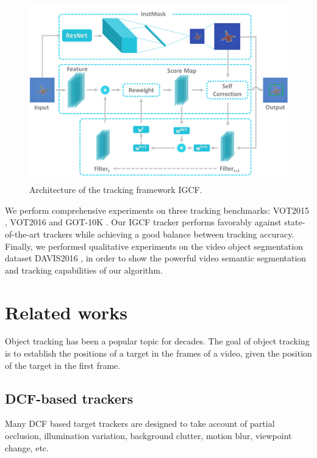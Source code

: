\documentclass[review]{elsarticle}
\begin{document}
\begin{CJK*}{UTF8}{gbsn}
\begin{figure}
    \centering
    \includegraphics[width=12cm]{images/instmask1.pdf}
    \caption{Architecture of the tracking framework IGCF.}
    \label{fig:IGCF}
\end{figure}

We perform comprehensive experiments on three tracking benchmarks: VOT2015 \cite{Kristan2015TheVO}, VOT2016 \cite{Kristan2016TheVO} and GOT-10K \cite{Huang2018GOT10kAL}. Our IGCF tracker performs favorably against state-of-the-art trackers while achieving a good balance between tracking accuracy. Finally, we performed qualitative experiments on the video object segmentation dataset DAVIS2016 \cite{Perazzi2016}, in order to show the powerful video semantic segmentation and tracking capabilities of our algorithm.

\section{Related works}
Object tracking has been a popular topic for decades. The goal of object tracking is to establish the positions of a target in the frames of a video, given the position of the target in the first frame.

\subsection{DCF-based trackers}
Many DCF based target trackers are designed to take account of partial occlusion, illumination variation, background clutter, motion blur, viewpoint change, etc.


\end{CJK*}
\end{document}
